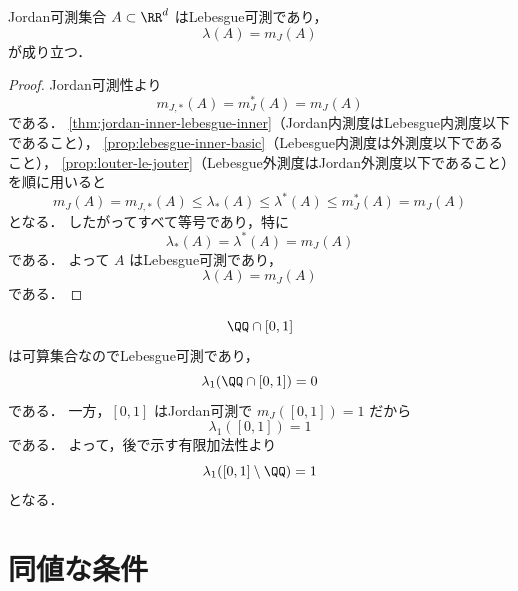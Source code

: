 \begin{theorem}[Jordan可測集合] \label{thm:lebesgue-jordan-measurable}
Jordan可測集合 $A\subset\RR^d$ はLebesgue可測であり，
\[
\lambda(A)=m_J(A)
\]
が成り立つ．
\end{theorem}
\begin{proof}
Jordan可測性より
\[
m_{J,*}(A)=m_J^*(A)=m_J(A)
\]
である．
\cref{thm:jordan-inner-lebesgue-inner}（Jordan内測度はLebesgue内測度以下であること），
\cref{prop:lebesgue-inner-basic}（Lebesgue内測度は外測度以下であること），
\cref{prop:louter-le-jouter}（Lebesgue外測度はJordan外測度以下であること）を順に用いると
\[
m_J(A)
=m_{J,*}(A)
\le \lambda_*(A)
\le \lambda^*(A)
\le m_J^*(A)
=m_J(A)
\]
となる．
したがってすべて等号であり，特に
\[
\lambda_*(A)=\lambda^*(A)=m_J(A)
\]
である．
よって $A$ はLebesgue可測であり，
\[
\lambda(A)=m_J(A)
\]
である．
\end{proof}

\begin{example}
\[
\QQ\cap[0,1]
\]
は可算集合なのでLebesgue可測であり，
\[
\lambda_1(\QQ\cap[0,1])=0
\]
である．
一方，$[0,1]$ はJordan可測で $m_J([0,1])=1$ だから
\[
\lambda_1([0,1])=1
\]
である．
よって，後で示す有限加法性より
\[
\lambda_1([0,1]\setminus\QQ)=1
\]
となる．
\end{example}

\section{同値な条件}

